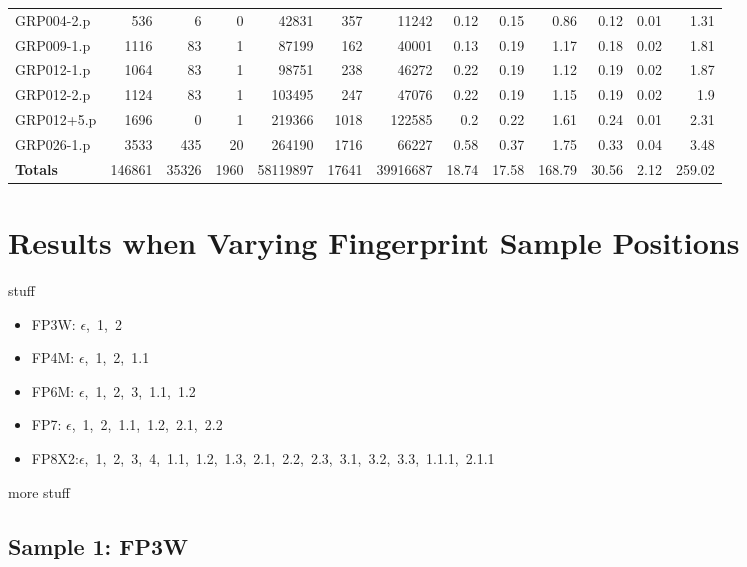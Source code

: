 \begin{table}[H]
\begin{adjustwidth}{-0.4in}{-0.5in}
\begin{tabular}{| l || r | r | r || r | r | r || r | r | r | r | r | r |}
GRP004-2.p&536&6&0&42831&357&11242&0.12&0.15&0.86&0.12&0.01&1.31\\
GRP009-1.p&1116&83&1&87199&162&40001&0.13&0.19&1.17&0.18&0.02&1.81\\
GRP012-1.p&1064&83&1&98751&238&46272&0.22&0.19&1.12&0.19&0.02&1.87\\
GRP012-2.p&1124&83&1&103495&247&47076&0.22&0.19&1.15&0.19&0.02&1.9\\
GRP012+5.p&1696&0&1&219366&1018&122585&0.2&0.22&1.61&0.24&0.01&2.31\\
GRP026-1.p&3533&435&20&264190&1716&66227&0.58&0.37&1.75&0.33&0.04&3.48\\ \hline \hline
\textbf{Totals}&146861&35326&1960&58119897&17641&39916687&18.74&17.58&168.79&30.56&2.12&259.02\\\hline
\end{tabular}\end{adjustwidth}\end{table}


\chapter{Results when Varying Fingerprint Sample Positions}
\label{app:app2}

stuff

\begin{itemize}
  \item FP3W: $\epsilon$,\ 1,\ 2
  \item FP4M: $\epsilon$,\ 1,\ 2,\ 1.1
  \item FP6M: $\epsilon$,\ 1,\ 2,\ 3,\ 1.1,\ 1.2
  \item FP7:  $\epsilon$,\ 1,\ 2,\ 1.1,\ 1.2,\ 2.1,\ 2.2
  \item FP8X2:$\epsilon$,\ 1,\ 2,\ 3,\ 4,\ 1.1,\ 1.2,\ 1.3,\ 2.1,\ 2.2,\ 2.3,\ 3.1,\ 3.2,\ 3.3,\ 1.1.1,\ 2.1.1
\end{itemize}

more stuff

\section{Sample 1: FP3W}

